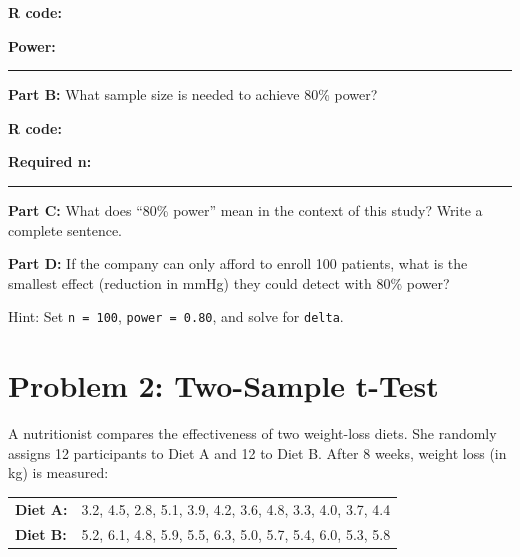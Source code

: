 \documentclass[11pt]{article}
\begin{document}
\vspace{0.3cm}

\textbf{R code:}

\vspace{2.5cm}

\textbf{Power:} \rule{3cm}{0.4pt}

\vspace{0.3cm}

\textbf{Part B:} What sample size is needed to achieve 80\% power?

\vspace{0.3cm}

\textbf{R code:}

\vspace{2.5cm}

\textbf{Required n:} \rule{3cm}{0.4pt}

\vspace{0.3cm}

\textbf{Part C:} What does ``80\% power'' mean in the context of this study? Write a complete sentence.

\vspace{2.5cm}

\textbf{Part D:} If the company can only afford to enroll 100 patients, what is the smallest effect (reduction in mmHg) they could detect with 80\% power?

\vspace{0.3cm}

Hint: Set \texttt{n = 100}, \texttt{power = 0.80}, and solve for \texttt{delta}.

\vspace{2.5cm}

\newpage

\section{Problem 2: Two-Sample t-Test}

A nutritionist compares the effectiveness of two weight-loss diets. She randomly assigns 12 participants to Diet A and 12 to Diet B. After 8 weeks, weight loss (in kg) is measured:

\vspace{0.3cm}

\begin{center}
\begin{tabular}{ll}
\textbf{Diet A:} & 3.2, 4.5, 2.8, 5.1, 3.9, 4.2, 3.6, 4.8, 3.3, 4.0, 3.7, 4.4 \\
\textbf{Diet B:} & 5.2, 6.1, 4.8, 5.9, 5.5, 6.3, 5.0, 5.7, 5.4, 6.0, 5.3, 5.8
\end{tabular}
\end{center}
\end{document}
